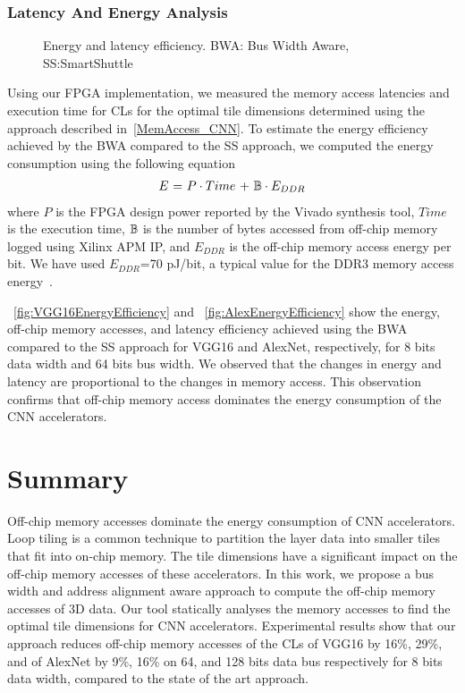 \subsubsection{Latency And Energy Analysis}
\begin{figure}[htb]
	\centering
	\hfil
	\hfil
	\caption{Energy and latency efficiency. BWA: Bus Width Aware, SS:SmartShuttle}
	\label{fig:EffectOnLatency}
	\vspace{-1.0em}
\end{figure}
Using our FPGA implementation, we measured the memory access latencies and execution time for CLs for the optimal tile dimensions determined using the approach described in~\ref{MemAccess_CNN}. To estimate the energy efficiency achieved by the BWA compared to the SS approach, we computed the energy consumption using the following equation~\cite{tu2017deep}
\begin{align}\label{eq:energyEfficiency}
	E~{=}~P\cdot Time~{+}~\mathbb{B}\cdot E_{DDR}
\end{align}
where $P$ is the FPGA design power reported by the Vivado synthesis tool, $Time$ is the execution time, $\mathbb{B}$ is the number of bytes accessed from off-chip memory logged using Xilinx APM IP, and $E_{DDR}$ is the off-chip memory access energy per bit. We have used $E_{DDR}$=70 pJ/bit, a typical value for the DDR3 memory access energy~\cite{6237004}.

\figurename{~\ref{fig:VGG16EnergyEfficiency}} and \figurename{~\ref{fig:AlexEnergyEfficiency}} show the energy, off-chip memory accesses, and latency efficiency achieved using the BWA compared to the SS approach for VGG16 and AlexNet, respectively, for 8 bits data width and 64 bits bus width. We observed that the changes in energy and latency are proportional to the changes in memory access. This observation confirms that off-chip memory access dominates the energy consumption of the CNN accelerators. 
\section{Summary}
Off-chip memory accesses dominate the energy consumption of CNN accelerators. Loop tiling is a common technique to partition the layer data into smaller tiles that fit into on-chip memory. The tile dimensions have a significant impact on the off-chip memory accesses of these accelerators. In this work, we propose a bus width and address alignment aware approach to compute the off-chip memory accesses of 3D data. Our tool statically analyses the memory accesses to find the optimal tile dimensions for CNN accelerators. Experimental results show that our approach reduces off-chip memory accesses of the CLs of VGG16 by 16\%, 29\%, and of AlexNet by 9\%, 16\% on 64, and 128 bits data bus respectively for 8 bits data width, compared to the state of the art approach.